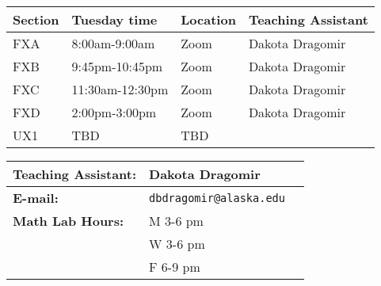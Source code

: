 \documentclass[12pt,fleqn]{article}
\begin{document}
\begin{tabular}{| l | l | l | l |}
 
\hline
\textbf{Section} & \textbf{Tuesday time} & \textbf{Location}& \textbf{Teaching Assistant} \\
\hline \hline
FXA&8:00am-9:00am&Zoom& Dakota Dragomir\\ \hline
FXB&9:45pm-10:45pm&Zoom& Dakota Dragomir\\ \hline
FXC&11:30am-12:30pm&Zoom& Dakota Dragomir\\ \hline
FXD&2:00pm-3:00pm&Zoom& Dakota Dragomir\\ \hline
UX1&TBD&TBD&\\ \hline
\end{tabular}

\vspace{1cm}
\begin{tabular}{| l || l | l |}
\hline
\textbf{Teaching Assistant:}& Dakota Dragomir \\
\hline \hline
\textbf{E-mail:}&\texttt{dbdragomir@alaska.edu} \texttt{} \\
\hline
\textbf{Math Lab Hours:}& M 3-6 pm\\
& W 3-6 pm\\
& F 6-9 pm\\
\hline

\hline
\end{tabular}

\vfill


%
%
%
\end{document}
